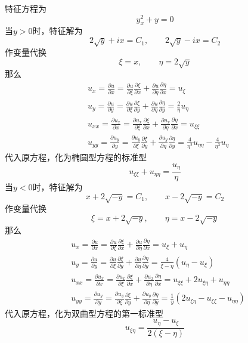 \documentclass[lang = cn, scheme = chinese, thmcnt = section]{elegantbook}
\begin{document}
\begin{solution}
	特征方程为
	$$
	y_x^2+y=0
	$$
	当$y>0$时，特征解为
	$$
	2\sqrt{y}+ix=C_1,\qquad
	2\sqrt{y}-ix=C_2
	$$
	作变量代换
	$$
	\xi=x,\qquad 
	\eta=2\sqrt{y}
	$$
	那么
	\begin{align*}
		& u_x=\frac{\partial u}{\partial x}=\frac{\partial u}{\partial \xi}\frac{\partial \xi}{\partial x}+\frac{\partial u}{\partial \eta}\frac{\partial \eta}{\partial x}=u_{\xi}\\
		& u_y=\frac{\partial u}{\partial y}=\frac{\partial u}{\partial \xi}\frac{\partial \xi}{\partial y}+\frac{\partial u}{\partial \eta}\frac{\partial \eta}{\partial y}=\frac{2}{\eta}u_\eta\\
		& u_{xx}=\frac{\partial u_x}{\partial x}=\frac{\partial u_x}{\partial \xi}\frac{\partial \xi}{\partial x}+\frac{\partial u_x}{\partial \eta}\frac{\partial \eta}{\partial x}=u_{\xi\xi}\\
		& u_{yy}=\frac{\partial u_y}{\partial y}=\frac{\partial u_y}{\partial \xi}\frac{\partial \xi}{\partial y}+\frac{\partial u_y}{\partial \eta}\frac{\partial \eta}{\partial y}=\frac{4}{\eta^2}u_{\eta\eta}-\frac{4}{\eta^3}u_\eta
	\end{align*}
	代入原方程，化为椭圆型方程的标准型
	$$
	u_{\xi\xi}+u_{\eta\eta}=\frac{u_\eta}{\eta}
	$$
	当$y<0$时，特征解为
	$$
	x+2\sqrt{-y}=C_1,\qquad
	x-2\sqrt{-y}=C_2
	$$
	作变量代换
	$$
	\xi=x+2\sqrt{-y},\qquad 
	\eta=x-2\sqrt{-y}
	$$
	那么
	\begin{align*}
		& u_x=\frac{\partial u}{\partial x}=\frac{\partial u}{\partial \xi}\frac{\partial \xi}{\partial x}+\frac{\partial u}{\partial \eta}\frac{\partial \eta}{\partial x}=u_{\xi}+u_{\eta}\\
		& u_y=\frac{\partial u}{\partial y}=\frac{\partial u}{\partial \xi}\frac{\partial \xi}{\partial y}+\frac{\partial u}{\partial \eta}\frac{\partial \eta}{\partial y}=\frac{4}{\xi-\eta}(u_\eta-u_\xi)\\
		& u_{xx}=\frac{\partial u_x}{\partial x}=\frac{\partial u_x}{\partial \xi}\frac{\partial \xi}{\partial x}+\frac{\partial u_x}{\partial \eta}\frac{\partial \eta}{\partial x}=u_{\xi\xi}+2u_{\xi\eta}+u_{\eta\eta}\\
		& u_{yy}=\frac{\partial u_y}{\partial y}=\frac{\partial u_y}{\partial \xi}\frac{\partial \xi}{\partial y}+\frac{\partial u_y}{\partial \eta}\frac{\partial \eta}{\partial y}=\frac{1}{y}(2u_{\xi\eta}-u_{\xi\xi}-u_{\eta\eta})
	\end{align*}
	代入原方程，化为双曲型方程的第一标准型
	$$
	u_{\xi\eta}=\frac{u_\eta-u_\xi}{2(\xi-\eta)}
	$$
\end{solution}
\end{document}
